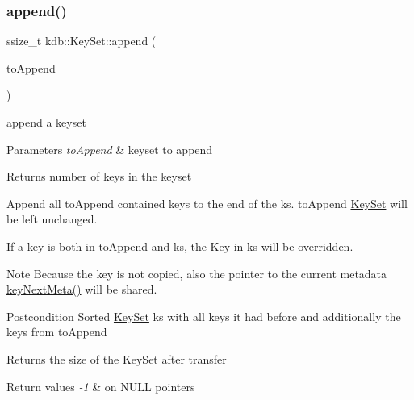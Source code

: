 \subsubsection{\texorpdfstring{append()}{append()}\hspace{0.1cm}{\footnotesize\ttfamily [2/2]}}
{\footnotesize\ttfamily ssize\+\_\+t kdb\+::\+Key\+Set\+::append (\begin{DoxyParamCaption}\item[{const \mbox{\hyperlink{classkdb_1_1KeySet}{Key\+Set}} \&}]{to\+Append }\end{DoxyParamCaption})\hspace{0.3cm}{\ttfamily [inline]}}



append a keyset 


\begin{DoxyParams}{Parameters}
{\em to\+Append} & keyset to append\\
\hline
\end{DoxyParams}
\begin{DoxyReturn}{Returns}
number of keys in the keyset
\end{DoxyReturn}
Append all {\ttfamily to\+Append} contained keys to the end of the {\ttfamily ks}. {\ttfamily to\+Append} \mbox{\hyperlink{classkdb_1_1KeySet}{Key\+Set}} will be left unchanged.

If a key is both in to\+Append and ks, the \mbox{\hyperlink{classkdb_1_1Key}{Key}} in ks will be overridden.

\begin{DoxyNote}{Note}
Because the key is not copied, also the pointer to the current metadata \mbox{\hyperlink{group__keymeta_ga4c88342f580a4291455a801af71ce048}{key\+Next\+Meta()}} will be shared.
\end{DoxyNote}
\begin{DoxyPostcond}{Postcondition}
Sorted \mbox{\hyperlink{classkdb_1_1KeySet}{Key\+Set}} ks with all keys it had before and additionally the keys from to\+Append 
\end{DoxyPostcond}
\begin{DoxyReturn}{Returns}
the size of the \mbox{\hyperlink{classkdb_1_1KeySet}{Key\+Set}} after transfer 
\end{DoxyReturn}

\begin{DoxyRetVals}{Return values}
{\em -\/1} & on N\+U\+LL pointers \\
\hline
\end{DoxyRetVals}

